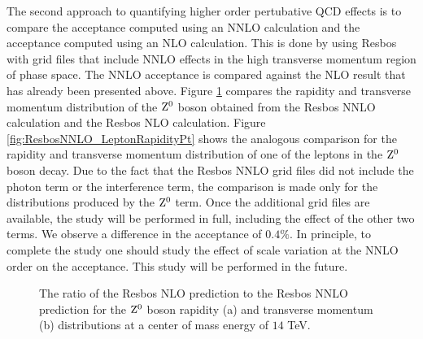 \documentclass{cmspaper}
\begin{document}
The second approach to quantifying higher order pertubative QCD effects is to compare the acceptance computed using an NNLO calculation and the acceptance computed using an NLO calculation. This is done by using Resbos with grid files that include NNLO effects in the high transverse momentum region of phase space. The NNLO acceptance is compared against the NLO result that has already been presented above. Figure \ref{fig:ResbosNNLO_ZRapidityPt} compares the rapidity and transverse momentum distribution of the $\mathrm{Z^0}$ boson obtained from the Resbos NNLO calculation and the Resbos NLO calculation. Figure \ref{fig:ResbosNNLO_LeptonRapidityPt} shows the analogous comparison for the rapidity and transverse momentum distribution of one of the leptons in the $\mathrm{Z^0}$ boson decay. Due to the fact that the Resbos NNLO grid files did not include the photon term or the interference term, the comparison is made only for the distributions produced by the $\mathrm{Z^0}$ term. Once the additional grid files are available, the study will be performed in full, including the effect of the other two terms. We observe a difference in the acceptance of $0.4\%$. In principle, to complete the study one should study the effect of scale variation at the NNLO order on the acceptance. This study will be performed in the future.

\begin{figure}[htb]
  \begin{center}
    \caption{The ratio of the Resbos NLO prediction to the Resbos NNLO prediction for the $\mathrm{Z^0}$ boson rapidity (a) and transverse momentum (b) distributions at a center of mass energy of $14$ TeV.}
    \label{fig:ResbosNNLO_ZRapidityPt}
  \end{center}
\end{figure}
\end{document}

